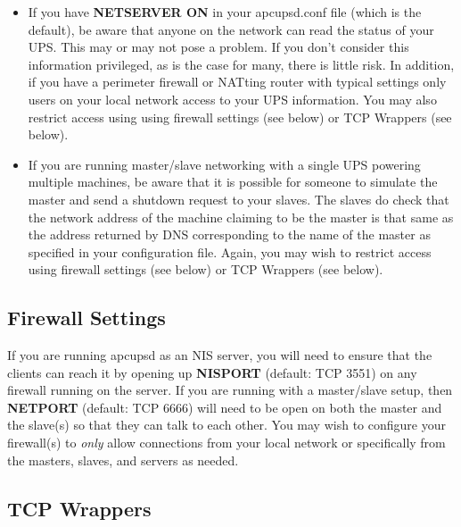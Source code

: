 {{{{{\begin{itemize}
\item If you have \textbf{NETSERVER ON} in your apcupsd.conf file (which is the
   default), be aware that anyone on the network can read the status of your UPS. 
   This may or may not pose a problem. If you don't consider this information
privileged, as is the case for many, there is little risk. In addition, if you
have a perimeter firewall or NATting router with typical settings
only users on your local network access to your UPS information.
You may also restrict access using using firewall settings (see below) or
TCP Wrappers (see below).

\item If you are running master/slave networking with a single UPS powering
   multiple machines, be aware that it is possible for someone to simulate the
   master and send a shutdown request to your slaves. The slaves do check that
the network address of the machine claiming to be the master is that same as
the address returned by DNS corresponding to the name of the master as
specified in your configuration file.   Again, you may wish to restrict
access  using firewall settings (see below) or TCP Wrappers (see below).
\end{itemize}

\label{Firewall-Settings}
\subsection*{Firewall Settings}
\label{Firewall-Settings}

If you are running apcupsd as an NIS server, you will need to ensure that
the clients can reach it by opening up \textbf{NISPORT} (default: TCP
3551) on any firewall running on the server.  If you are running with a
master/slave setup, then \textbf{NETPORT} (default: TCP 6666) will need
to be open on both the master and the slave(s) so that they can talk to
each other.  You may wish to configure your firewall(s) to \emph{only}
allow connections from your local network or specifically from the
masters, slaves, and servers as needed.


\label{TCP-Wrappers}

\subsection*{TCP Wrappers}

}}}}}
